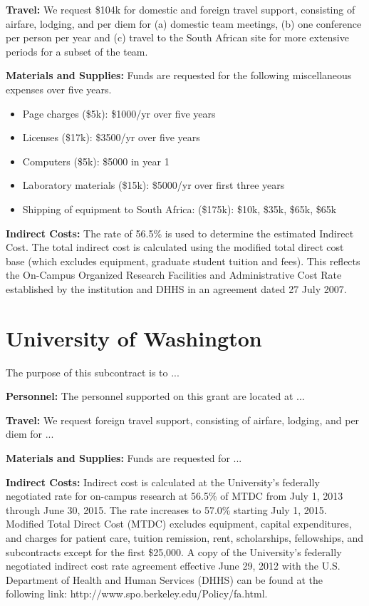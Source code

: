 \documentclass[onecolumn,11pt]{aastex}
\begin{document}
{\bf Travel:} We request \$104k for domestic and foreign travel support, consisting of airfare, lodging, and per diem for (a) domestic team meetings, (b) one conference per person per year and (c) travel to the South African site for more extensive periods for a subset of the team.

{\bf Materials and Supplies:}  Funds are requested for the following miscellaneous expenses over five years.
\begin{itemize}
\item Page charges (\$5k): \$1000/yr over five years
\item Licenses (\$17k):  \$3500/yr over five years
\item Computers (\$5k):  \$5000 in year 1
\item Laboratory materials (\$15k):  \$5000/yr over first three years
\item Shipping of equipment to South Africa:  (\$175k):  \$10k, \$35k, \$65k, \$65k
\end{itemize}

{\bf Indirect Costs:}
The rate of 56.5\% is used to determine the estimated Indirect Cost. The total indirect cost is calculated using the modified total direct cost base (which excludes equipment, graduate student tuition and fees). This reflects the On-Campus Organized Research Facilities and Administrative Cost Rate established by the institution and DHHS in an agreement dated 27 July 2007.



\section*{University of Washington}
The purpose of this subcontract is to ...

{\bf Personnel:} 
The personnel supported on this grant are located at ...

{\bf Travel:} We request foreign travel support, consisting of airfare, lodging,
and per diem for ...

{\bf Materials and Supplies:}  Funds are requested for ... 

{\bf Indirect Costs:}
Indirect cost is calculated at the University's federally negotiated rate for on-campus research at 56.5\% of MTDC from July 1, 2013 through June 30, 2015.  The rate increases to 57.0\% starting July 1, 2015.  Modified Total Direct Cost (MTDC) excludes equipment, capital expenditures, and charges for patient care, tuition remission, rent, scholarships, fellowships, and subcontracts except for the first \$25,000.  A copy of the University's federally negotiated indirect cost rate agreement effective June 29, 2012 with the U.S. Department of Health and Human Services (DHHS) can be found at the following link: http://www.spo.berkeley.edu/Policy/fa.html.
\end{document}
